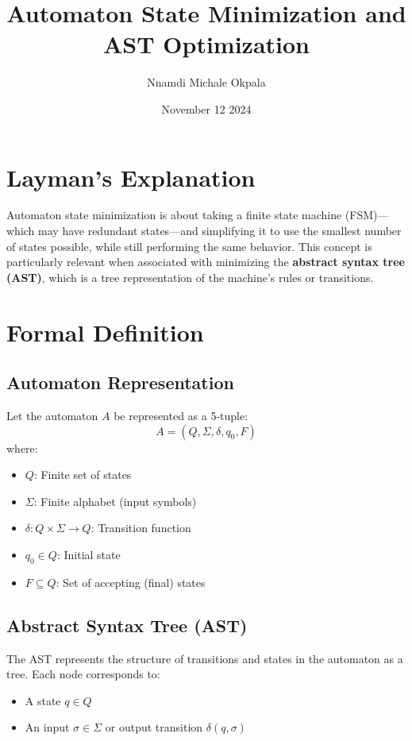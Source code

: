 \documentclass{article}
\title{Automaton State Minimization and AST Optimization}
\author{Nnamdi Michale Okpala}
\date{November 12 2024}
\begin{document}
\maketitle

\section{Layman's Explanation}
Automaton state minimization is about taking a finite state machine (FSM)---which may have redundant states---and simplifying it to use the smallest number of states possible, while still performing the same behavior. This concept is particularly relevant when associated with minimizing the \textbf{abstract syntax tree (AST)}, which is a tree representation of the machine's rules or transitions.

\section{Formal Definition}

\subsection{Automaton Representation}
Let the automaton $A$ be represented as a 5-tuple:
\[
A = (Q, \Sigma, \delta, q_0, F)
\]
where:
\begin{itemize}
    \item $Q$: Finite set of states
    \item $\Sigma$: Finite alphabet (input symbols)
    \item $\delta: Q \times \Sigma \to Q$: Transition function
    \item $q_0 \in Q$: Initial state
    \item $F \subseteq Q$: Set of accepting (final) states
\end{itemize}

\subsection{Abstract Syntax Tree (AST)}
The AST represents the structure of transitions and states in the automaton as a tree. Each node corresponds to:
\begin{itemize}
    \item A state $q \in Q$
    \item An input $\sigma \in \Sigma$ or output transition $\delta(q, \sigma)$
\end{itemize}
\end{document}
